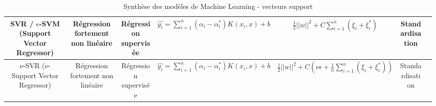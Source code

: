 \begin{table}[h!]
\begin{tabularx}{\textwidth}{|C|C|C|C|C|C|C|}
SVR / $\epsilon$-SVM (Support Vector Regressor)    & Régression fortement non linéaire                                                         & Régression supervisée                & $\hat{y_i} = \sum_{i=1}^{n}(\alpha_{i} - \alpha_{i}^{*}) K(x_{i},x) + b$        & $\frac{1}{2}||w||^2 + C\sum_{i=1}^{n}(\xi_{i} + \xi_{i}^{*})$                                      & Standardisation \\
\hline

$\nu$-SVR ($\nu$-Support Vector Regressor)         & Régression fortement non linéaire                                                         & Régression supervisée                & $\hat{y_i} = \sum_{i=1}^{n}(\alpha_{i} - \alpha_{i}^{*}) K(x_{i},x) + b$        & $\frac{1}{2}||w||^2 + C(\nu\epsilon + \frac{1}{n}\sum_{i=1}^{n}(\xi_{i} + \xi_{i}^{*}))$           & Standardisation \\
\hline

\end{tabularx}
\caption{Synthèse des modèles de Machine Learning - vecteurs support}
\end{table}

\newpage

